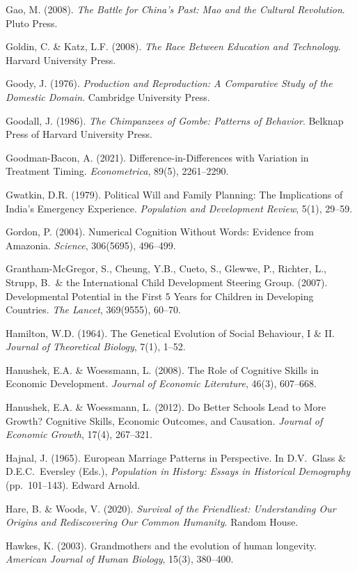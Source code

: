 \documentclass[12pt,letterpaper]{article}
\begin{document}
Gao, M. (2008). \emph{The Battle for China's Past: Mao and the Cultural
Revolution}. Pluto Press.

Goldin, C. \& Katz, L.F. (2008). \emph{The Race Between Education and
Technology}. Harvard University Press.

Goody, J. (1976). \emph{Production and Reproduction: A Comparative
Study of the Domestic Domain}. Cambridge University Press.

Goodall, J. (1986). \emph{The Chimpanzees of Gombe: Patterns of
Behavior}. Belknap Press of Harvard University Press.

Goodman-Bacon, A. (2021). Difference-in-Differences with Variation in
Treatment Timing. \emph{Econometrica}, 89(5), 2261--2290.

Gwatkin, D.R. (1979). Political Will and Family Planning: The
Implications of India's Emergency Experience. \emph{Population and
Development Review}, 5(1), 29--59.

Gordon, P. (2004). Numerical Cognition Without Words: Evidence from
Amazonia. \emph{Science}, 306(5695), 496--499.

Grantham-McGregor, S., Cheung, Y.B., Cueto, S., Glewwe, P., Richter,
L., Strupp, B.\ \& the International Child Development Steering Group.
(2007). Developmental Potential in the First 5 Years for Children in
Developing Countries. \emph{The Lancet}, 369(9555), 60--70.

Hamilton, W.D. (1964). The Genetical Evolution of Social Behaviour, I
\& II. \emph{Journal of Theoretical Biology}, 7(1), 1--52.

Hanushek, E.A. \& Woessmann, L. (2008). The Role of Cognitive Skills in
Economic Development. \emph{Journal of Economic Literature}, 46(3),
607--668.

Hanushek, E.A. \& Woessmann, L. (2012). Do Better Schools Lead to More
Growth? Cognitive Skills, Economic Outcomes, and Causation.
\emph{Journal of Economic Growth}, 17(4), 267--321.

Hajnal, J. (1965). European Marriage Patterns in Perspective. In
D.V.~Glass \& D.E.C.~Eversley (Eds.), \emph{Population in History:
Essays in Historical Demography} (pp.~101--143). Edward Arnold.

Hare, B. \& Woods, V. (2020). \emph{Survival of the Friendliest:
Understanding Our Origins and Rediscovering Our Common Humanity}.
Random House.

Hawkes, K. (2003). Grandmothers and the evolution of human
longevity. \emph{American Journal of Human Biology}, 15(3), 380--400.
\end{document}

